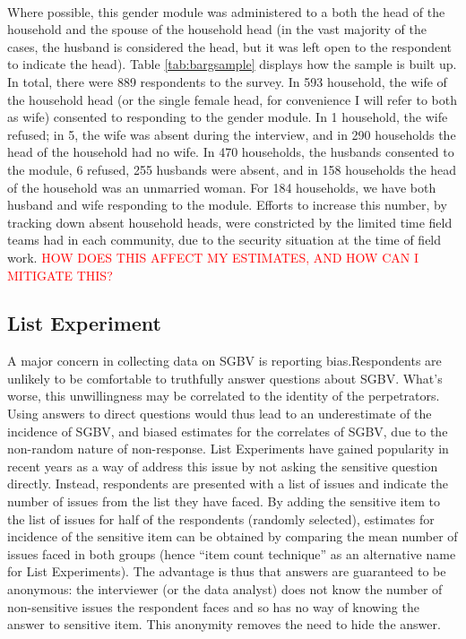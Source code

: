 \documentclass[11pt,a4paper]{scrartcl} %
\begin{document}
\paragraph{}
Where possible, this gender module was administered to a both the head of the household and the spouse of the household head (in the vast majority of the cases, the husband is considered the head, but it was left open to the respondent to indicate the head). Table \ref{tab:bargsample} displays how the sample is built up. In total, there were 889 respondents to the survey. In 593 household, the wife of the household head (or the single female head, for convenience I will refer to both as wife) consented to responding to the gender module. In 1 household, the wife refused; in 5, the wife was absent during the interview, and in 290 households the head of the household had no wife. In 470 households, the husbands consented to the module, 6 refused, 255 husbands were absent, and in 158 households the head of the household was an unmarried woman. For 184 households, we have both husband and wife responding to the module. Efforts to increase this number, by tracking down absent household heads, were constricted by the limited time field teams had in each community, due to the security situation at the time of field work. \textcolor{red}{HOW DOES THIS AFFECT MY ESTIMATES, AND HOW CAN I MITIGATE THIS?}

\subsection*{List Experiment}
A major concern in collecting data on SGBV is reporting bias.Respondents are unlikely to be comfortable to truthfully answer questions about SGBV. What's worse, this unwillingness may be correlated to the identity of the perpetrators\citep{Stark2017}. Using answers to direct questions would thus lead to an underestimate of the incidence of SGBV, and biased estimates for the correlates of SGBV, due to the non-random nature of non-response. List Experiments have gained popularity in recent years as a way of address this issue by not asking the sensitive question directly. Instead, respondents are presented with a list of issues and indicate the number of issues from the list they have faced. By adding the sensitive item to the list of issues for half of the respondents (randomly selected), estimates for incidence of the sensitive item can be obtained by comparing the mean number of issues faced in both groups (hence ``item count technique'' as an alternative name for List Experiments). The advantage is thus that answers are guaranteed to be anonymous: the interviewer (or the data analyst) does not know the number of non-sensitive issues the respondent faces and so has no way of knowing the answer to sensitive item. This anonymity removes the need to hide the answer. 
\end{document}
